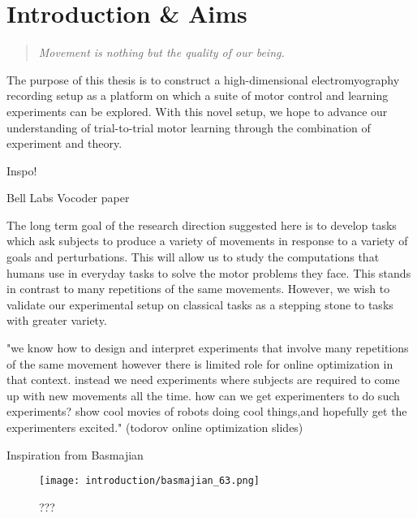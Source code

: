 \documentclass[../main.tex]{subfiles}
\begin{document}
\chapter{Introduction \& Aims}\label{chap:intro}

\bigskip
\begin{quote}
  \emph{Movement is nothing but the quality of our being.}
  
\end{quote}

\cleardoublepage%




The purpose of this thesis is to construct a high-dimensional electromyography recording setup as a platform on which a suite of motor control and learning experiments can be explored. With this novel setup, we hope to advance our understanding of trial-to-trial motor learning through the combination of experiment and theory.



Inspo!

Bell Labs Vocoder paper


The long term goal of the research direction suggested here is to develop tasks which ask subjects to produce a variety of movements in response to a variety of goals and perturbations. This will allow us to study the computations that humans use in everyday tasks to solve the motor problems they face. This stands in contrast to many repetitions of the same movements. However, we wish to validate our experimental setup on classical tasks as a stepping stone to tasks with greater variety.



"we know how to design and interpret experiments that involve many repetitions of the same movement however there is limited role for online optimization in that context. instead we need experiments where subjects are required to come up with new movements all the time. how can we get experimenters to do such experiments? show cool movies of robots doing cool things,and hopefully get the experimenters excited." (todorov online optimization slides)



Inspiration from Basmajian
\begin{figure}
  \centering
  \texttt{[image: introduction/basmajian\_63.png]}
  \caption{???}
  \label{fig:basmajian_63}
\end{figure}
\end{document}

